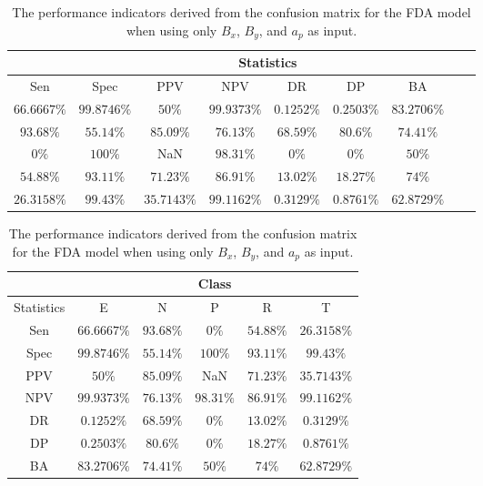 \begin{table}[!ht]
	\centering
	\begin{tabular}{|c|c|c|c|c|c|c|c|c|}
		\hline
		 & \multicolumn{7}{c|}{Statistics} \\ \hline
		Sen & Spec & PPV & NPV & DR & DP & BA \\ \hline
		$66.6667\%$ & $99.8746\%$ & $50\%$ & $99.9373\%$ & $0.1252\%$ & $0.2503\%$ & $83.2706\%$ \\ \hline
		$93.68\%$ & $55.14\%$ & $85.09\%$ & $76.13\%$ & $68.59\%$ & $80.6\%$ & $74.41\%$ \\ \hline
		$0\%$ & $100\%$ & NaN & $98.31\%$ & $0\%$ & $0\%$ & $50\%$ \\ \hline
		$54.88\%$ & $93.11\%$ & $71.23\%$ & $86.91\%$ & $13.02\%$ & $18.27\%$ & $74\%$ \\ \hline
		$26.3158\%$ & $99.43\%$ & $35.7143\%$ & $99.1162\%$ & $0.3129\%$ & $0.8761\%$ & $62.8729\%$ \\ \hline
	\end{tabular}
	\caption{The performance indicators derived from the confusion matrix for the FDA model when using only $B_{x}$, $B_{y}$, and $a_{p}$ as input.}
	\label{tab:cs:xyap:fda}
\end{table}

\begin{table}[!ht]
	\centering
	\begin{tabular}{|c|c|c|c|c|c|}
		\hline
		 & \multicolumn{5}{c|}{Class} \\ \hline
		Statistics & E & N & P & R & T \\ \hline
		Sen & $66.6667\%$ & $93.68\%$ & $0\%$ & $54.88\%$ & $26.3158\%$ \\ \hline
		Spec & $99.8746\%$ & $55.14\%$ & $100\%$ & $93.11\%$ & $99.43\%$ \\ \hline
		PPV & $50\%$ & $85.09\%$ & NaN & $71.23\%$ & $35.7143\%$ \\ \hline
		NPV & $99.9373\%$ & $76.13\%$ & $98.31\%$ & $86.91\%$ & $99.1162\%$ \\ \hline
		DR & $0.1252\%$ & $68.59\%$ & $0\%$ & $13.02\%$ & $0.3129\%$ \\ \hline
		DP & $0.2503\%$ & $80.6\%$ & $0\%$ & $18.27\%$ & $0.8761\%$ \\ \hline
		BA & $83.2706\%$ & $74.41\%$ & $50\%$ & $74\%$ & $62.8729\%$ \\ \hline
	\end{tabular}
	\caption{The performance indicators derived from the confusion matrix for the FDA model when using only $B_{x}$, $B_{y}$, and $a_{p}$ as input.}
	\label{tab:cs:reverse:xyap:fda}
\end{table}

